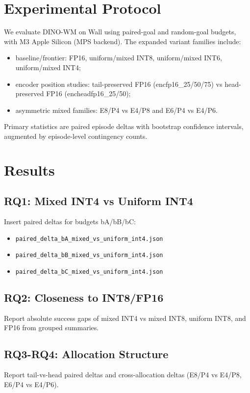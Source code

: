 \documentclass{article}
\begin{document}
\section{Experimental Protocol}
We evaluate DINO-WM on Wall using paired-goal and random-goal budgets, with M3 Apple Silicon (MPS backend).
The expanded variant families include:
\begin{itemize}
  \item baseline/frontier: FP16, uniform/mixed INT8, uniform/mixed INT6, uniform/mixed INT4;
  \item encoder position studies: tail-preserved FP16 (encfp16\_25/50/75) vs head-preserved FP16 (encheadfp16\_25/50);
  \item asymmetric mixed families: E8/P4 vs E4/P8 and E6/P4 vs E4/P6.
\end{itemize}
Primary statistics are paired episode deltas with bootstrap confidence intervals, augmented by episode-level contingency counts.

\section{Results}
\subsection{RQ1: Mixed INT4 vs Uniform INT4}
Insert paired deltas for budgets bA/bB/bC:
\begin{itemize}
  \item \texttt{paired\_delta\_bA\_mixed\_vs\_uniform\_int4.json}
  \item \texttt{paired\_delta\_bB\_mixed\_vs\_uniform\_int4.json}
  \item \texttt{paired\_delta\_bC\_mixed\_vs\_uniform\_int4.json}
\end{itemize}

\subsection{RQ2: Closeness to INT8/FP16}
Report absolute success gaps of mixed INT4 vs mixed INT8, uniform INT8, and FP16 from grouped summaries.

\subsection{RQ3-RQ4: Allocation Structure}
Report tail-vs-head paired deltas and cross-allocation deltas (E8/P4 vs E4/P8, E6/P4 vs E4/P6).
\end{document}
